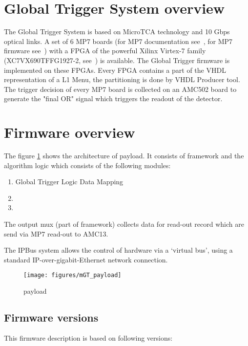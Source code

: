 \section{Global Trigger System overview}\label{sec:fw:gt_system}

The Global Trigger System is based on MicroTCA technology and 10 Gbps optical links. A set of 6 MP7 boards (for MP7 documentation see~\cite{MP7}, for MP7 firmware see~\cite{MP7 firmware}) with a FPGA of the powerful Xilinx Virtex-7 family (XC7VX690TFFG1927-2, see~\cite{Virtex7}) is available. The Global Trigger firmware is implemented on these FPGAs. Every FPGA contains a part of the VHDL representation of a L1 Menu, the partitioning is done by VHDL Producer tool. The trigger decision of every MP7 board is collected on an AMC502 board to generate the "final OR" signal which triggers the readout of the detector.

\section{Firmware overview}\label{sec:fw:fw}
The figure \ref{fig:mgt} shows the architecture of \ugt payload. It consists of framework and the algorithm logic which consists of the following modules:
\begin{enumerate}
\item Global Trigger Logic Data Mapping
\item \ugtl
\item \ufdl
\end{enumerate}

The output mux (part of framework) collects data for read-out record which are send via MP7 read-out to AMC13.

The IPBus system allows the control of hardware via a ‘virtual bus’, using a standard IP-over-gigabit-Ethernet network connection.
\begin{figure}[h!]
   \centering
    \texttt{[image: figures/mGT\_payload]}
    \caption{\ugt payload}\label{fig:mgt}
 \end{figure}

\subsection{Firmware versions}\label{sec:fw:fw_version}

This firmware description is based on following versions:

